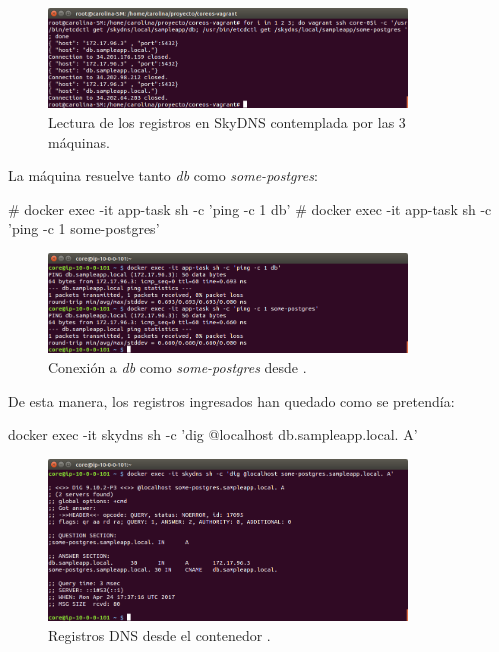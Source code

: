 \begin{figure}[H]
\centering
\includegraphics[width=0.85\textwidth]{images/figures/skydns-gets.png}
\caption{Lectura de los registros en SkyDNS contemplada por las 3 máquinas.}
\end{figure}

La máquina  resuelve tanto \textit{db} como \textit{some-postgres}:

\begin{code}
# docker exec -it app-task sh -c 'ping -c 1 db'
# docker exec -it app-task sh -c 'ping -c 1 some-postgres'
\end{code}

\begin{figure}[H]
\centering
\includegraphics[width=0.85\textwidth]{images/figures/skydns-ping.png}
\caption{Conexión a \textit{db} como \textit{some-postgres} desde .}
\end{figure}

De esta manera, los registros ingresados han quedado como se pretendía:

\begin{code}
docker exec -it skydns sh -c 'dig @localhost db.sampleapp.local. A'
\end{code}

\begin{figure}[H]
\centering
\includegraphics[width=0.85\textwidth]{images/figures/skydns-dig.png}
\caption{Registros DNS desde el contenedor .}
\end{figure}

